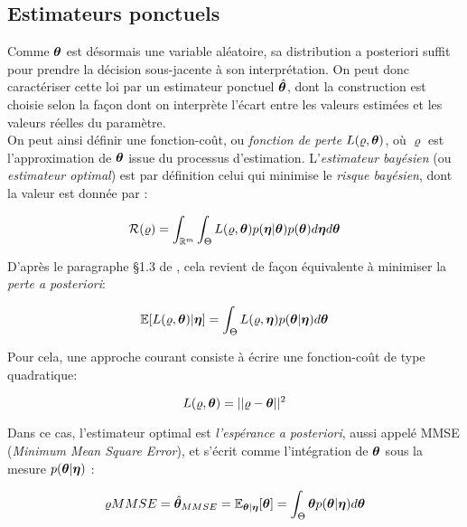 	\subsection{Estimateurs ponctuels}
Comme ${\bm{\theta}}$ est désormais une variable aléatoire, sa distribution a posteriori suffit pour prendre la décision sous-jacente à son interprétation. On peut donc caractériser cette loi par un estimateur ponctuel $\hat{{\bm{\theta}}}$, dont la construction est choisie selon la façon dont on interprète l'écart entre les valeurs estimées et les valeurs réelles du paramètre.\\

On peut ainsi définir une fonction-coût, ou \textit{fonction de perte} $L(\varrho, {\bm{\theta}})$, où $\varrho$ est l'approximation de ${\bm{\theta}}$ issue du processus d'estimation. L'\textit{estimateur bayésien} (ou \textit{estimateur optimal}) est par définition celui qui minimise le \textit{risque bayésien}, dont la valeur est donnée par : 

\begin{equation}
\mathcal{R}(\varrho) = \int_{\mathbb{R}^m} \int_{\Theta} L(\varrho,{\bm{\theta}})p({\bm{\eta}} | {\bm{\theta}})p({\bm{\theta}}) d{\bm{\eta}} d{\bm{\theta}}
\label{eq_risque_bayesien}
\end{equation}

D'après le paragraphe §1.3 de \cite{Robert2004}, cela revient de façon équivalente à minimiser la \textit{perte a posteriori}:

\begin{equation}
\mathbb{E}[L(\varrho,{\bm{\theta}})|{\bm{\eta}}] = \int_{\Theta} L(\varrho,{\bm{\eta}}){p({\bm{\theta}} | {\bm{\eta}})} d{\bm{\theta}}
\label{eq_perte_a_posteriori}
\end{equation}

Pour cela, une approche courant consiste à écrire une fonction-coût de type quadratique:

\begin{equation}
L(\varrho,{\bm{\theta}}) = || \varrho - {\bm{\theta}} ||^2
\label{eq_fonction_cout_bayesien_quadratique}
\end{equation}
	
Dans ce cas, l'estimateur optimal est \textit{l'espérance a posteriori}, aussi appelé MMSE (\textit{Minimum Mean Square Error}), et s'écrit comme l'intégration de ${\bm{\theta}}$ sous la mesure $p({\bm{\theta}} | {\bm{\eta}})$ : 

\begin{equation}
\varrho{MMSE} = \hat{{\bm{\theta}}}_{MMSE} = \mathbb{E}_{{\bm{\theta}} | {\bm{\eta}}}[{\bm{\theta}}] = \int_{\Theta}{\bm{\theta}} {p({\bm{\theta}} | {\bm{\eta}})} d{\bm{\theta}}
\label{eq_definition_mmse}
\end{equation}

